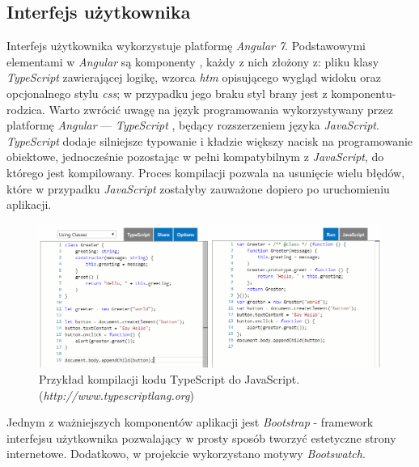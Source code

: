 \documentclass[eng,printmode,openany]{mgr}
\begin{document}
	\subsection{Interfejs użytkownika}
	Interfejs użytkownika wykorzystuje platformę \textit{Angular 7}. Podstawowymi elementami w \textit{Angular} są komponenty \cite{angular-components}, każdy z nich złożony z: pliku klasy \textit{TypeScript} zawierającej logikę, wzorca \textit{htm} opisującego wygląd widoku oraz opcjonalnego stylu \textit{css}; w przypadku jego braku styl brany jest z komponentu-rodzica. Warto zwrócić uwagę na język programowania wykorzystywany przez platformę \textit{Angular} — \textit{TypeScript} \cite{msdn-ts}, będący rozszerzeniem języka \textit{JavaScript}. \textit{TypeScript} dodaje silniejsze typowanie i kładzie większy nacisk na programowanie obiektowe, jednocześnie pozostając w pełni kompatybilnym z \textit{JavaScript}, do którego jest kompilowany. Proces kompilacji pozwala na usunięcie wielu błędów, które w przypadku \textit{JavaScript} zostałyby zauważone dopiero po uruchomieniu aplikacji.
	\begin{figure}[H]
		\centering
		\includegraphics[width=\textwidth]{images/ts-to-js.png}
		\caption{Przykład kompilacji kodu TypeScript do JavaScript. (\textit{http://www.typescriptlang.org})}
	\end{figure}
	Jednym z ważniejszych komponentów aplikacji jest \textit{Bootstrap} - framework interfejsu użytkownika pozwalający w prosty sposób tworzyć estetyczne strony internetowe. Dodatkowo, w projekcie wykorzystano motywy \textit{Bootswatch}.
	
\end{document}
